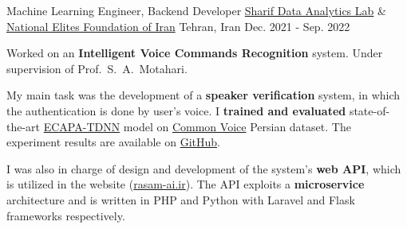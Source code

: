 \begin{cventries}
  \cventry
    {Machine Learning Engineer, Backend Developer} %
    {\href{https://www.sharif.edu/}{Sharif Data Analytics Lab} \& \href{https://en.bmn.ir/}{National Elites Foundation of Iran}} %
    {Tehran, Iran} %
    {Dec. 2021 - Sep. 2022} %
    {
      \begin{cvitems} %
        \item {Worked on an \textbf{Intelligent Voice Commands Recognition} system. Under supervision of Prof.~S.~A.~Motahari.}
        \item {My main task was the development of a \textbf{speaker verification} system, in which the authentication is done by user's voice. I \textbf{trained and evaluated} state-of-the-art \href{https://arxiv.org/abs/2005.07143}{ECAPA-TDNN} model on \href{https://commonvoice.mozilla.org}{Common Voice} Persian dataset. The experiment results are available on \href{https://github.com/radinshayanfar/speaker-verification}{GitHub}.}
        \item{I was also in charge of design and development of the system's \textbf{web API}, which is utilized in the website (\href{https://rasam-ai.ir/}{rasam-ai.ir}). The API exploits a \textbf{microservice} architecture and is written in PHP and Python with Laravel and Flask frameworks respectively.}
      \end{cvitems}
    }


\end{cventries}


